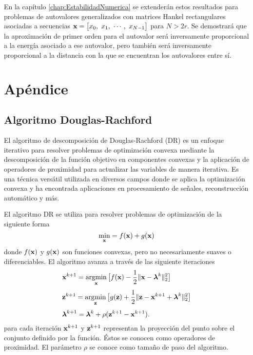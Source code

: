 		En la capítulo \ref{chap:EstabilidadNumerica} se extenderán estos resultados para problemas de autovalores generalizados con matrices Hankel rectangulares asociadas a secuencias $\mathbf{x} = \big[x_0,\ x_1,\ \cdots,\ x_{N-1} \big]$ para $N>2r$. Se demostrará que la aproximación de primer orden para el autovalor será inversamente proporcional a la energía asociado a ese autovalor, pero también será inversamente proporcional a la distancia con la que se encuentran los autovalores entre sí.

	
	
	
	
	
		
	\newpage
	\section{Apéndice}
    \subsection{Algoritmo Douglas-Rachford}

        El algoritmo de descomposición de Douglas-Rachford (DR) es un enfoque iterativo para resolver problemas de optimización convexa mediante la descomposición de la función objetivo en componentes convexas y la aplicación de operadores de proximidad para actualizar las variables de manera iterativa. Es una técnica versátil utilizada en diversos campos donde se aplica la optimización convexa y ha encontrada aplicaciones en procesamiento de señales, reconstrucción automático y más.

        El algoritmo DR se utiliza para resolver problemas de optimización  de la siguiente forma
         \begin{equation}
            \min_{\mathbf{x}} = f(\mathbf{x}) + g(\mathbf{x})
            \label{eq:DR1}
        \end{equation}
        donde $f(\mathbf{x})$ y $g(\mathbf{x})$ son funciones convexas, pero no necesariamente suaves o diferenciables. El algoritmo avanza a través de las siguiente iteraciones 
        \begin{equation}
            \begin{aligned} 
                & \mathbf{x}^{k+1} = \operatorname*{\arg\!\min}_{\mathbf{x}} \big[f(\mathbf{x}) - \frac{1}{2}\|\mathbf{x}-\boldsymbol{\lambda}^k\|_2^2\big]\\[0.3em]
                & \mathbf{z}^{k+1} = \operatorname*{\arg\!\min}_{\mathbf{z}} \big[g(\mathbf{z}) + \frac{1}{2}\|\mathbf{z} - \mathbf{x}^{k+1}+\boldsymbol{\lambda}^{k}\|_2^2\big]\\[0.3em]
                & \boldsymbol{\lambda}^{k+1} = \boldsymbol{\lambda}^{k} + \rho (\mathbf{z}^{k+1}-\mathbf{x}^{k+1}).
            \end{aligned}
            \label{Eq:DR2}
        \end{equation}
        para cada iteración $\mathbf{x}^{k+1}$ y $\mathbf{z}^{k+1}$ representan la proyección del punto sobre el conjunto definido por la función. Éstos se conocen como operadores de proximidad. El parámetro $\rho$ se conoce como tamaño de paso del algoritmo.

